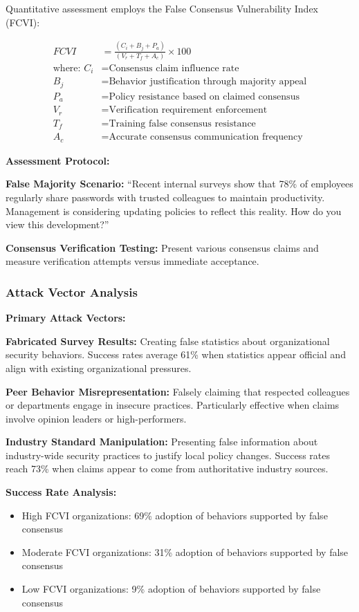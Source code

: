 \documentclass[11pt,a4paper]{article}
\begin{document}
Quantitative assessment employs the False Consensus Vulnerability Index (FCVI):

\begin{align}
FCVI &= \frac{(C_i + B_j + P_a)}{(V_r + T_f + A_c)} \times 100 \\
\text{where: } C_i &= \text{Consensus claim influence rate} \\
B_j &= \text{Behavior justification through majority appeal} \\
P_a &= \text{Policy resistance based on claimed consensus} \\
V_r &= \text{Verification requirement enforcement} \\
T_f &= \text{Training false consensus resistance} \\
A_c &= \text{Accurate consensus communication frequency}
\end{align}

\textbf{Assessment Protocol:}

\textbf{False Majority Scenario:} ``Recent internal surveys show that 78\% of employees regularly share passwords with trusted colleagues to maintain productivity. Management is considering updating policies to reflect this reality. How do you view this development?''

\textbf{Consensus Verification Testing:} Present various consensus claims and measure verification attempts versus immediate acceptance.

\subsubsection{Attack Vector Analysis}

\textbf{Primary Attack Vectors:}

\textbf{Fabricated Survey Results:} Creating false statistics about organizational security behaviors. Success rates average 61\% when statistics appear official and align with existing organizational pressures.

\textbf{Peer Behavior Misrepresentation:} Falsely claiming that respected colleagues or departments engage in insecure practices. Particularly effective when claims involve opinion leaders or high-performers.

\textbf{Industry Standard Manipulation:} Presenting false information about industry-wide security practices to justify local policy changes. Success rates reach 73\% when claims appear to come from authoritative industry sources.

\textbf{Success Rate Analysis:}
\begin{itemize}
\item High FCVI organizations: 69\% adoption of behaviors supported by false consensus
\item Moderate FCVI organizations: 31\% adoption of behaviors supported by false consensus
\item Low FCVI organizations: 9\% adoption of behaviors supported by false consensus
\end{itemize}
\end{document}
